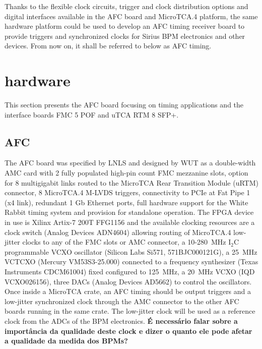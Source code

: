 \documentclass[a4paper,
               biblatex,      %
               ]{jacow}
\begin{document}
Thanks to the flexible clock circuits, trigger and clock distribution options and digital interfaces available in the AFC board and MicroTCA.4 platform, the same hardware platform could be used to develop an AFC timing receiver board to provide triggers and synchronized clocks for Sirius BPM electronics and other devices. From now on, it shall be referred to below as AFC timing. 

\section{hardware}
This section presents the AFC board focusing on timing applications and the interface boards FMC 5 POF and uTCA RTM 8 SFP+.

\subsection{AFC}

The AFC board was specified by LNLS and designed by WUT as a double-width AMC card with 2 fully populated high-pin count FMC mezzanine slots, option for 8 multigigabit links routed to the MicroTCA Rear Transition Module (uRTM) connector, 8 MicroTCA.4 M-LVDS triggers, connectivity to PCIe at Fat Pipe 1 (x4 link), redundant 1 Gb Ethernet ports, full hardware support for the White Rabbit timing system and provision for standalone operation. The FPGA device in use is Xilinx Artix-7 200T FFG1156 and the available clocking resources are a clock switch (Analog Devices ADN4604) allowing routing of MicroTCA.4 low-jitter clocks to any of the FMC slots or AMC connector, a 10-280~MHz I$_{2}$C programmable VCXO oscillator (Silicon Labs Si571, 571BJC000121G), a 25~MHz VCTCXO (Mercury VM53S3-25.000) connected to a frequency synthesizer (Texas Instruments CDCM61004) fixed configured to 125~MHz, a 20~MHz VCXO (IQD VCXO026156), three DACs (Analog Devices AD5662) to control the oscillators. Once inside a MicroTCA crate, an AFC timing should be output triggers and a low-jitter synchronized clock through the AMC connector to the other AFC boards running in the same crate. The low-jitter clock will be used as a reference clock from the ADCs of the BPM electronics. \textbf{É necessário falar sobre a importância da qualidade deste clock e dizer o quanto ele pode afetar a qualidade da medida dos BPMs?}
\end{document}
